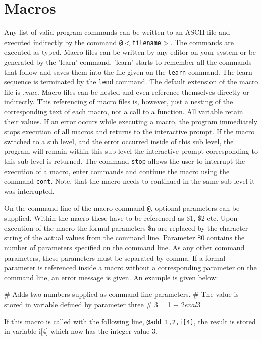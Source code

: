 \section{Macros \label{mac}}

Any list of valid program commands can be written to an ASCII
file and executed indirectly by the command {\tt @$<$filename$>$}.
The commands are executed as typed.  Macro files can be written by any
editor on your system or be generated by the 'learn' command.
'learn' starts to remember all the commands that follow and saves
them into the file given on the {\tt learn} command.  The learn
sequence is terminated by the {\tt lend} command.  The default
extension of the macro file is {\it .mac}.  Macro files can be
nested and even reference themselves directly or indirectly.  This
referencing of macro files is, however, just a nesting of the
corresponding text of each macro, not a call to a function.  All
variable retain their values.  If an error occurs while executing a
macro, the program immediately stops execution of all macros and
returns to the interactive prompt.  If the macro switched to a
sub level, and the error occurred inside of this sub level, the program
will remain within this sub level the interactive prompt
corresponding to this sub level is returned. The command {\tt stop}
allows the user to interrupt the execution of a macro, enter
commands and continue the macro using the command {\tt cont}. Note,
that the macro needs to continued in the same sub level it was
interrupted.
\par

On the command line of the macro command {\tt @}, optional
parameters can be supplied.  Within the macro these have to be
referenced as \$1, \$2 etc.  Upon execution of the macro the formal
parameters \$n are replaced by the character string of the actual
values from the command line. Parameter \$0 contains the number of
parameters specified on the command line. As any other command
parameters, these parameters must be separated by comma.  If a
formal parameter is referenced inside a macro without a
corresponding parameter on the command line, an error message is
given.  An example is given below:

\begin{MacVerbatim}
     # Adds two numbers supplied as command line parameters.
     # The value is stored in variable defined by parameter three
     #
     $3 = $1 + $2
     eval $3
\end{MacVerbatim}

If this macro is called with the following line, {\tt @add
1,2,i[4]}, the result is stored in variable i[4] which now has the
integer value 3.
\par

